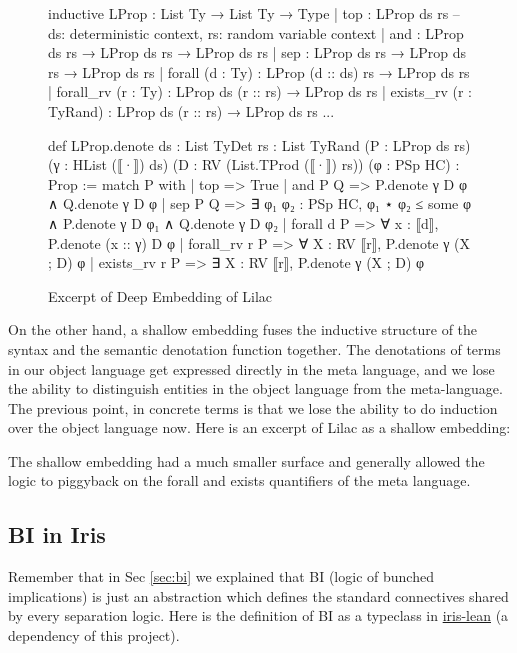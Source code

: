 \begin{figure}[htbp]
  \centering
  \begin{minipage}{0.9\linewidth}
\begin{leancode}
inductive LProp : List Ty → List Ty → Type
  | top : LProp ds rs -- ds: deterministic context, rs: random variable context
  | and  : LProp ds rs  → LProp ds rs → LProp ds rs
  | sep  : LProp ds rs  → LProp ds rs → LProp ds rs
  | forall (d : Ty) : LProp (d :: ds) rs → LProp ds rs
  | forall_rv (r : Ty) : LProp ds (r :: rs) → LProp ds rs
  | exists_rv (r : TyRand) : LProp ds (r :: rs) → LProp ds rs
  ...

def LProp.denote {ds : List TyDet} {rs : List TyRand} (P : LProp ds rs)
    (γ : HList (⟦·⟧) ds) (D : RV (List.TProd (⟦·⟧) rs)) (φ : PSp HC) : Prop :=
  match P with
  | top  => True
  | and P Q => P.denote γ D φ ∧ Q.denote γ D φ
  | sep P Q => ∃ φ₁ φ₂ : PSp HC, φ₁ ⋆ φ₂ ≤ some φ ∧ P.denote γ D φ₁ ∧ Q.denote γ D φ₂
  | forall d P => ∀ x : ⟦d⟧, P.denote (x :: γ) D φ
  | forall_rv r P => ∀ X : RV ⟦r⟧, P.denote γ (X ; D) φ
  | exists_rv r P => ∃ X : RV ⟦r⟧, P.denote γ (X ; D) φ
\end{leancode}
  \end{minipage}
  \caption{Excerpt of Deep Embedding of Lilac}
  \label{fig:deep-embedding}
\end{figure}


On the other hand, a shallow embedding fuses the inductive structure of the syntax and the semantic denotation function together. The denotations of terms
in our object language get expressed directly in the meta language, and we lose the ability to distinguish entities in the object language from the meta-language. The previous
point, in concrete terms is that we lose the ability to do induction over the object language now. Here is an excerpt of Lilac as a shallow embedding:

\begin{leancode}

\end{leancode}

The shallow embedding had a much smaller surface and generally allowed the logic to piggyback on the forall and exists quantifiers of the meta language. 

\subsection{BI in Iris}
Remember that in Sec \ref{sec:bi} we explained that BI (logic of bunched implications) is just an abstraction which defines the standard connectives
shared by every separation logic. Here is the definition of BI as a typeclass in 
\href{https://github.com/leanprover-community/iris-lean/blob/bb24268a8a9b5ddb23224a8c1db66eadd4b9beb7/Iris/Iris/BI/BIBase.lean#L21-L36}{iris-lean} (a dependency of this project).

